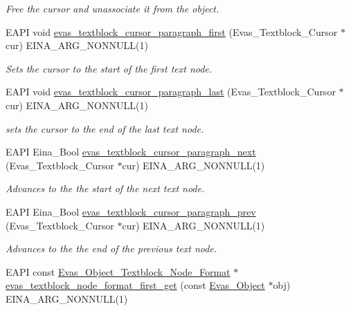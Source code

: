 \begin{DoxyCompactItemize}
\begin{DoxyCompactList}\small\item\em Free the cursor and unassociate it from the object. \item\end{DoxyCompactList}\item 
EAPI void \hyperlink{group__Evas__Object__Textblock_ga445a498191535460cf6de442cb2b3a41}{evas\_\-textblock\_\-cursor\_\-paragraph\_\-first} (Evas\_\-Textblock\_\-Cursor $\ast$cur) EINA\_\-ARG\_\-NONNULL(1)
\begin{DoxyCompactList}\small\item\em Sets the cursor to the start of the first text node. \item\end{DoxyCompactList}\item 
EAPI void \hyperlink{group__Evas__Object__Textblock_ga2654bf905bdd0fe98402abe105c815d0}{evas\_\-textblock\_\-cursor\_\-paragraph\_\-last} (Evas\_\-Textblock\_\-Cursor $\ast$cur) EINA\_\-ARG\_\-NONNULL(1)
\begin{DoxyCompactList}\small\item\em sets the cursor to the end of the last text node. \item\end{DoxyCompactList}\item 
EAPI Eina\_\-Bool \hyperlink{group__Evas__Object__Textblock_ga85773221b22e6d042cc6b581de08c87a}{evas\_\-textblock\_\-cursor\_\-paragraph\_\-next} (Evas\_\-Textblock\_\-Cursor $\ast$cur) EINA\_\-ARG\_\-NONNULL(1)
\begin{DoxyCompactList}\small\item\em Advances to the the start of the next text node. \item\end{DoxyCompactList}\item 
EAPI Eina\_\-Bool \hyperlink{group__Evas__Object__Textblock_gabe9fa26c799408129f013440e518f699}{evas\_\-textblock\_\-cursor\_\-paragraph\_\-prev} (Evas\_\-Textblock\_\-Cursor $\ast$cur) EINA\_\-ARG\_\-NONNULL(1)
\begin{DoxyCompactList}\small\item\em Advances to the the end of the previous text node. \item\end{DoxyCompactList}\item 
EAPI const \hyperlink{Evas_8h_adcd2409468741c89d607f06e17da1f64}{Evas\_\-Object\_\-Textblock\_\-Node\_\-Format} $\ast$ \hyperlink{group__Evas__Object__Textblock_ga56e9057e5845fe785710ba6c5d07ab3e}{evas\_\-textblock\_\-node\_\-format\_\-first\_\-get} (const \hyperlink{group__Evas__Object__Group_ga9e19e6dd1f517a0ba437c0114d3e7c97}{Evas\_\-Object} $\ast$obj) EINA\_\-ARG\_\-NONNULL(1)

\end{DoxyCompactItemize}
